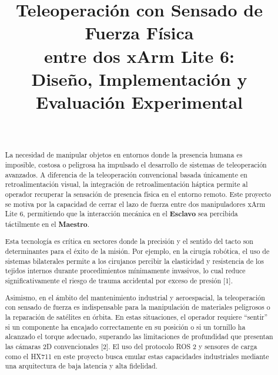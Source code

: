 \documentclass[journal,10pt,twoside]{IEEEtran}
\begin{document}
\title{Teleoperación con Sensado de Fuerza Física\\
  entre dos xArm Lite 6:\\
  Diseño, Implementación y Evaluación Experimental}

\author{%
  \\
}

\maketitle

\begin{abstract}
La necesidad de manipular objetos en entornos donde la presencia humana es imposible, costosa o peligrosa ha impulsado el desarrollo de sistemas de teleoperación avanzados. A diferencia de la teleoperación convencional basada únicamente en retroalimentación visual, la integración de retroalimentación háptica permite al operador recuperar la sensación de presencia física en el entorno remoto. Este proyecto se motiva por la capacidad de cerrar el lazo de fuerza entre dos manipuladores xArm Lite 6, permitiendo que la interacción mecánica en el \textbf{Esclavo} sea percibida táctilmente en el \textbf{Maestro}.

Esta tecnología es crítica en sectores donde la precisión y el sentido del tacto son determinantes para el éxito de la misión. Por ejemplo, en la cirugía robótica, el uso de sistemas bilaterales permite a los cirujanos percibir la elasticidad y resistencia de los tejidos internos durante procedimientos mínimamente invasivos, lo cual reduce significativamente el riesgo de trauma accidental por exceso de presión [1].

Asimismo, en el ámbito del mantenimiento industrial y aeroespacial, la teleoperación con sensado de fuerza es indispensable para la manipulación de materiales peligrosos o la reparación de satélites en órbita. En estas situaciones, el operador requiere ``sentir'' si un componente ha encajado correctamente en su posición o si un tornillo ha alcanzado el torque adecuado, superando las limitaciones de profundidad que presentan las cámaras 2D convencionales [2]. El uso del protocolo ROS 2 y sensores de carga como el HX711 en este proyecto busca emular estas capacidades industriales mediante una arquitectura de baja latencia y alta fidelidad.

\end{abstract}
\end{document}

